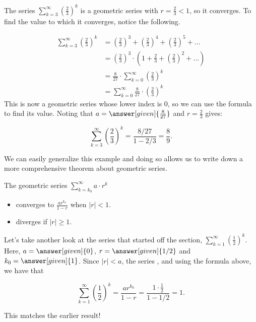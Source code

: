 \documentclass{ximera}
\begin{document}
\begin{example}
The series $\sum_{k=3}^{\infty} \left(\frac{2}{3}\right)^k$ is a geometric series with $r=\frac{2}{3}<1$, so it converges.  To find the value to which it converges, notice the following.

\begin{align*}
\sum_{k=3}^{\infty} \left(\frac{2}{3}\right)^k &=  \left(\frac{2}{3}\right)^3+ \left(\frac{2}{3}\right)^4+ \left(\frac{2}{3}\right)^5+\ldots \\
&= \left(\frac{2}{3}\right)^3 \cdot \left(1+ \frac{2}{3}+ \left(\frac{2}{3}\right)^2+\ldots\right) \\
&= \frac{8}{27}  \cdot  \sum_{k=0}^{\infty}\left(\frac{2}{3}\right)^k \\
&= \sum_{k=0}^{\infty} \frac{8}{27}  \cdot \left(\frac{2}{3}\right)^k
\end{align*}
This is now a geometric series whose lower index is $0$, so we can use the formula to find its value. Noting that $a=\answer[given]{ \frac{8}{27} }$ and $r= \frac{2}{3}$ gives:

\[
\sum_{k=3}^{\infty} \left(\frac{2}{3}\right)^k = \frac{8/27}{1-2/3} = \frac{8}{9}.
\]
\end{example}

We can easily generalize this example and doing so allows us to write down a more comprehensive theorem about geometric series.

\begin{theorem}
  The geometric series $\sum_{k= k_0}^\infty a \cdot r^k$ 
  
  \begin{itemize} 
  \item converges to $\frac{ar^{k_0}}{1-r}$ when $|r| < 1$.
  \item diverges if $|r| \geq 1$.  
  \end{itemize}
  \end{theorem}
 
\begin{example}
Let's take another look at the series that started off the section, $\sum_{k=1}^{\infty} \left(\frac{1}{2}\right)^k$.  Here, $a=\answer[given]{0}$, $r=\answer[given]{1/2}$ and $k_0 = \answer[given]{1}$.  Since $|r|<a$, the series , and using the formula above, we have that

\[ \sum_{k=1}^{\infty} \left(\frac{1}{2}\right)^k = \frac{ar^{k_0}}{1-r} = \frac{1\cdot \frac{1}{2}}{1-1/2} =1.\]

This matches the earlier result!  
\end{example}
\end{document}
